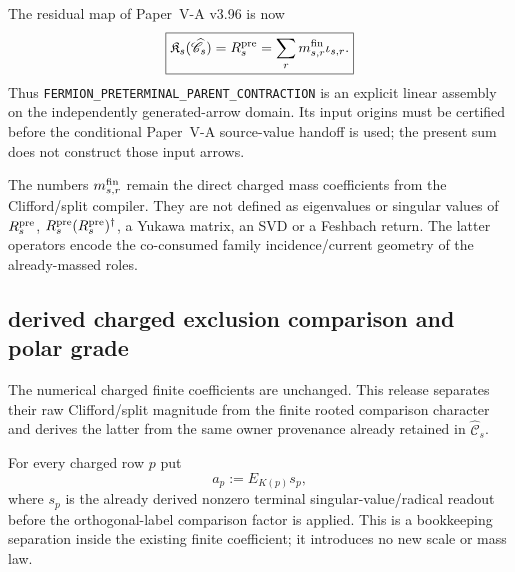 \documentclass[12pt,a4paper]{article}
\begin{document}
\begin{corollary}
\label{p6:cor:v590-preterminal-contraction-explicit}
The residual map of Paper~V-A v3.96 is now
\[
 \boxed{
 \mathfrak K_s(\widehat{\mathscr C}_s)=R_s^{\rm pre}
 =\sum_r m^{\rm fin}_{s,r}\iota_{s,r}.}
\]
Thus \texttt{FERMION\_PRETERMINAL\_PARENT\_CONTRACTION} is an explicit
linear assembly on the independently generated-arrow domain. Its input
origins must be certified before the conditional Paper~V-A source-value
handoff is used; the present sum does not construct those input arrows.
\end{corollary}

\begin{remark}
\label{p6:rem:v590-no-mass-spectrum-reinterpretation}
The numbers $m^{\rm fin}_{s,r}$ remain the direct charged mass coefficients
from the Clifford/split compiler.  They are not defined as eigenvalues or
singular values of $R_s^{\rm pre}$, $R_s^{\rm pre}(R_s^{\rm pre})^\dagger$,
a Yukawa matrix, an SVD or a Feshbach return.  The latter operators encode the
co-consumed family incidence/current geometry of the already-massed roles.
\end{remark}

\subsection*{derived charged exclusion comparison and polar grade}
\label{p6:sec:v591-charged-comparison-grade-closure}
The numerical charged finite coefficients are unchanged.  This release
separates their raw Clifford/split magnitude from the finite rooted comparison
character and derives the latter from the same owner provenance already
retained in $\widehat{\mathscr C}_s$.

\begin{definition}
\label{p6:def:v591-raw-charged-geometric-coefficient}
For every charged row $p$ put
\[
 \boxed{a_p:=E_{K(p)}s_p,}
\]
where $s_p$ is the already derived nonzero terminal singular-value/radical
readout before the orthogonal-label comparison factor is applied.  This is a
bookkeeping separation inside the existing finite coefficient; it introduces
no new scale or mass law.
\end{definition}
\end{document}

